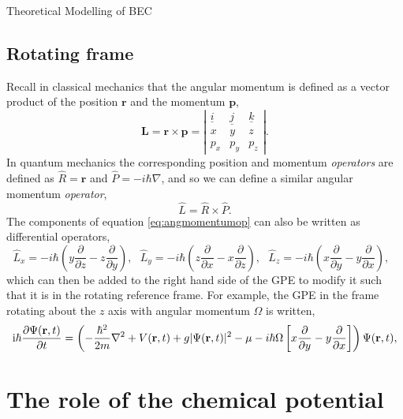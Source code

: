 \begin{chapter}{\label{cha:theoretical_model}Theoretical Modelling of BEC}
	\subsection{\label{section:rotatingframe} Rotating frame}
	Recall in classical mechanics that the angular momentum is defined as a vector product of the position $\mathbf{r}$ and the momentum $\mathbf{p}$,
	\begin{equation*}
		\mathbf{L} = \mathbf{r} \times \mathbf{p} = 
		\left| \begin{array}{ccc}
\underline{i} & \underline{j} & \underline{k} \\
x & y & z \\
p_x & p_y & p_z \end{array} \right|.
	\end{equation*}
	In quantum mechanics the corresponding position and momentum {\it operators} are defined as $\hat{R} = \mathbf{r}$ and $\hat{P} = -i\hbar\nabla$, and so we can define a similar angular momentum {\it operator},
	\begin{equation}\label{eq:angmomentumop}
		\hat{L} = \hat{R} \times \hat{P}.
	\end{equation}
	The components of equation \ref{eq:angmomentumop} can also be written as differential operators,
	\begin{equation}
		\hat{L}_x = -i\hbar\left ( y \frac{\partial}{\partial z} - z \frac{\partial}{\partial y} \right ),~~~
		\hat{L}_y = -i\hbar\left ( z \frac{\partial}{\partial x} - x \frac{\partial}{\partial z} \right ),~~~
		\hat{L}_z = -i\hbar\left ( x \frac{\partial}{\partial y} - y \frac{\partial}{\partial x} \right ),~~~
	\end{equation}
 which can then be added to the right hand side of the GPE to modify it such that it is in the rotating reference frame. For example, the GPE in the frame rotating about the $z$ axis with angular momentum $\Omega$ is written,
	\begin{equation}\label{eq:rotframegpe}
	\mathrm{i}\hbar \frac{\partial\Psi({\bf r},t)}{\partial t} = \left(-\frac{\hbar^2}{2m}\nabla^2 + V({\bf r},t) + g|\Psi({\bf r},t)|^2 - \mu -i\hbar\Omega\left [ x \frac{\partial}{\partial y} - y \frac{\partial}{\partial x} \right ] \right ) \Psi({\bf r},t),
	\end{equation}

\section{\label{section:mu} The role of the chemical potential}

\end{chapter}
